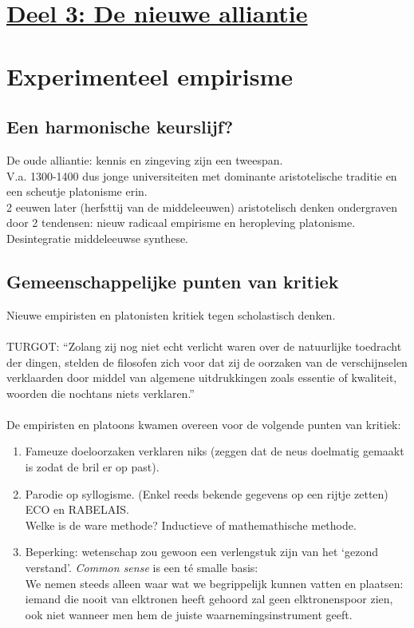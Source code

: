 \documentclass[11pt,a4paper]{article}
\begin{document}
\section*{\centering \underline{Deel 3: De nieuwe alliantie}}
\section{Experimenteel empirisme}
\subsection{Een harmonische keurslijf?}
De oude alliantie: kennis en zingeving zijn een tweespan.
\\
V.a. 1300-1400 dus jonge universiteiten met dominante aristotelische traditie en een scheutje platonisme erin.
\\
2 eeuwen later (herfsttij van de middeleeuwen) aristotelisch denken ondergraven door 2 tendensen: nieuw radicaal empirisme en heropleving platonisme.
\\
Desintegratie middeleeuwse synthese.
\subsection{Gemeenschappelijke punten van kritiek}
Nieuwe empiristen en platonisten kritiek tegen scholastisch denken.
\\
\\
TURGOT: “Zolang zij nog niet echt verlicht waren over de natuurlijke toedracht der dingen, stelden de filosofen zich voor dat zij de oorzaken van de verschijnselen verklaarden door middel van algemene uitdrukkingen zoals essentie of kwaliteit, woorden die nochtans niets verklaren.”
\\
\\
De empiristen en platoons kwamen overeen voor de volgende punten van kritiek:
\begin{enumerate}
\item Fameuze doeloorzaken verklaren niks (zeggen dat de neus doelmatig gemaakt is zodat de bril er op past).
\item Parodie op syllogisme. (Enkel reeds bekende gegevens op een rijtje zetten)
ECO en RABELAIS.
\\
Welke is de ware methode? Inductieve of mathemathische methode.
\item Beperking: wetenschap zou gewoon een verlengstuk zijn van het ‘gezond verstand’. \textit{Common sense} is een t\'e smalle basis:
\\We nemen steeds alleen waar wat we begrippelijk kunnen vatten en plaatsen: iemand die nooit van elktronen heeft gehoord zal geen elktronenspoor zien, ook niet wanneer men hem de juiste waarnemingsinstrument geeft.
\end{enumerate}
\end{document}
